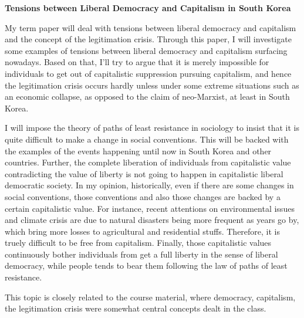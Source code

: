 \documentclass{homework}
\title{}
\date{\today}
\begin{document}
\vspace*{1cm}

\begin{center}
  \Large \bf Tensions between Liberal Democracy and Capitalism in South Korea
\end{center}
\vspace*{1cm}

My term paper will deal with tensions between liberal democracy and capitalism and the concept of the legitimation crisis. Through this paper, I will investigate some examples of tensions between liberal democracy and capitalism surfacing nowadays. Based on that, I'll try to argue that it is merely impossible for individuals to get out of capitalistic suppression pursuing capitalism, and hence the legitimation crisis occurs hardly unless under some extreme situations such as an economic collapse, as opposed to the claim of neo-Marxist, at least in South Korea.

I will impose the theory of paths of least resistance in sociology to insist that it is quite difficult to make a change in social conventions. This will be backed with the examples of the events happening until now in South Korea and other countries.
Further, the complete liberation of individuals from capitalistic value contradicting the value of liberty is not going to happen in capitalistic liberal democratic society. In my opinion, historically, even if there are some changes in social conventions, those conventions and also those changes are backed by a certain capitalistic value. For instance, recent attentions on environmental issues and climate crisis are due to natural disasters being more frequent as years go by, which bring more losses to agricultural and residential stuffs. Therefore, it is truely difficult to be free from capitalism.
Finally, those capitalistic values continuously bother individuals from get a full liberty in the sense of liberal democracy, while people tends to bear them following the law of paths of least resistance.

This topic is closely related to the course material, where democracy, capitalism, the legitimation crisis were somewhat central concepts dealt in the class.
\end{document}
